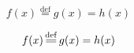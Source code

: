 \documentclass[border=2pt]{standalone}
\newcommand*{\MyDef}{\mathrm{def}}
\newcommand*{\eqdefU}{\ensuremath{\overset{\MyDef}{=}}}%
\newcommand*{\eqdef}{\mathop{\overset{\MyDef}{\resizebox{\widthof{\eqdefU}}{\heightof{=}}{=}}}}
\begin{document}
\[ f(x) \eqdefU g(x) = h(x) \]%

\[ f(x) \eqdef  g(x) = h(x) \]%
\end{document}
